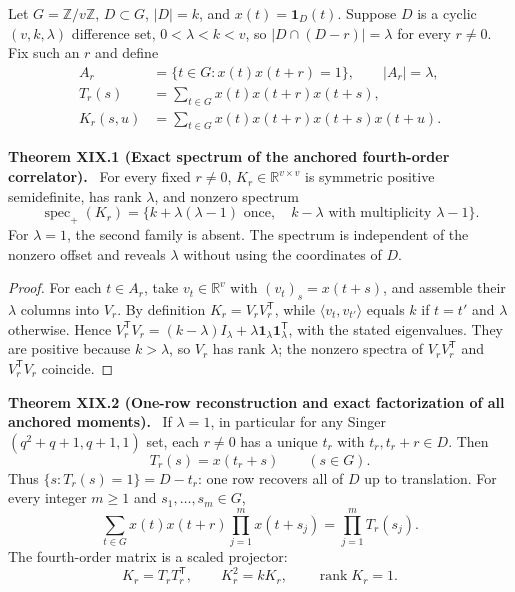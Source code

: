 \documentclass[11pt,a4paper,oneside]{book}
\newcommand{\R}{\mathbb R}\newcommand{\C}{\mathbb C}\newcommand{\Z}{\mathbb Z}\newcommand{\N}{\mathbb N}\newcommand{\Q}{\mathbb Q}
\newcommand{\one}{\mathbf 1}\newcommand{\ii}{\mathrm i}\newcommand{\dd}{\mathrm d}
\DeclareMathOperator{\rank}{rank}\DeclareMathOperator{\Tr}{Tr}
\DeclareMathOperator{\spec}{spec}\DeclareMathOperator{\diag}{diag}
\newcommand{\statement}[3]{\par\medskip\noindent\textbf{#1 #2 (#3).}\ }
\begin{document}
Let $G=\Z/v\Z$, $D\subset G$, $|D|=k$, and $x(t)=\one_D(t)$. Suppose $D$ is a cyclic $(v,k,\lambda)$ difference set, $0<\lambda<k<v$, so $|D\cap(D-r)|=\lambda$ for every $r\ne0$. Fix such an $r$ and define
\begin{align}A_r&=\{t\in G:x(t)x(t+r)=1\},\qquad|A_r|=\lambda,\tag{92}\\
T_r(s)&=\sum_{t\in G}x(t)x(t+r)x(t+s),\tag{93}\\
K_r(s,u)&=\sum_{t\in G}x(t)x(t+r)x(t+s)x(t+u).\tag{94}\end{align}
\statement{Theorem}{XIX.1}{Exact spectrum of the anchored fourth-order correlator} For every fixed $r\ne0$, $K_r\in\R^{v\times v}$ is symmetric positive semidefinite, has rank $\lambda$, and nonzero spectrum
\begin{equation}\spec_+(K_r)=\{k+\lambda(\lambda-1)\text{ once},\quad k-\lambda\text{ with multiplicity }\lambda-1\}.\tag{95}\end{equation}
For $\lambda=1$, the second family is absent. The spectrum is independent of the nonzero offset and reveals $\lambda$ without using the coordinates of $D$.
\begin{proof}For each $t\in A_r$, take $v_t\in\R^v$ with $(v_t)_s=x(t+s)$, and assemble their $\lambda$ columns into $V_r$. By definition $K_r=V_rV_r^{\mathsf T}$, while $\langle v_t,v_{t'}\rangle$ equals $k$ if $t=t'$ and $\lambda$ otherwise. Hence $V_r^{\mathsf T}V_r=(k-\lambda)I_\lambda+\lambda\one_\lambda\one_\lambda^{\mathsf T}$, with the stated eigenvalues. They are positive because $k>\lambda$, so $V_r$ has rank $\lambda$; the nonzero spectra of $V_rV_r^{\mathsf T}$ and $V_r^{\mathsf T}V_r$ coincide.\end{proof}
\statement{Theorem}{XIX.2}{One-row reconstruction and exact factorization of all anchored moments} If $\lambda=1$, in particular for any Singer $(q^2+q+1,q+1,1)$ set, each $r\ne0$ has a unique $t_r$ with $t_r,t_r+r\in D$. Then
\begin{equation}T_r(s)=x(t_r+s)\qquad(s\in G).\tag{96}\end{equation}
Thus $\{s:T_r(s)=1\}=D-t_r$: one row recovers all of $D$ up to translation. For every integer $m\ge1$ and $s_1,\ldots,s_m\in G$,
\begin{equation}\sum_{t\in G}x(t)x(t+r)\prod_{j=1}^m x(t+s_j)=\prod_{j=1}^mT_r(s_j).\tag{97}\end{equation}
The fourth-order matrix is a scaled projector:
\begin{equation}K_r=T_rT_r^{\mathsf T},\qquad K_r^2=kK_r,\qquad\rank K_r=1.\tag{98}\end{equation}
\end{document}
